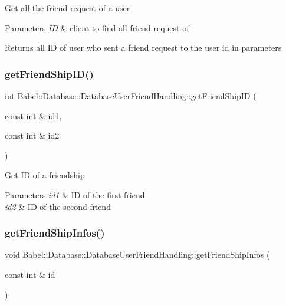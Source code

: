 Get all the friend request of a user 
\begin{DoxyParams}{Parameters}
{\em ID} & client to find all friend request of \\
\hline
\end{DoxyParams}
\begin{DoxyReturn}{Returns}
all ID of user who sent a friend request to the user id in parameters 
\end{DoxyReturn}
\mbox{\label{classBabel_1_1Database_1_1DatabaseUserFriendHandling_a5447e835948344c871e7f47fb66f26c0}} 
\subsubsection{\texorpdfstring{get\+Friend\+Ship\+I\+D()}{getFriendShipID()}}
{\footnotesize\ttfamily int Babel\+::\+Database\+::\+Database\+User\+Friend\+Handling\+::get\+Friend\+Ship\+ID (\begin{DoxyParamCaption}\item[{const int \&}]{id1,  }\item[{const int \&}]{id2 }\end{DoxyParamCaption})}

Get ID of a friendship 
\begin{DoxyParams}{Parameters}
{\em id1} & ID of the first friend \\
\hline
{\em id2} & ID of the second friend \\
\hline
\end{DoxyParams}
\mbox{\label{classBabel_1_1Database_1_1DatabaseUserFriendHandling_a2bed1d6913f15db98bc4ebadf0135310}} 
\subsubsection{\texorpdfstring{get\+Friend\+Ship\+Infos()}{getFriendShipInfos()}}
{\footnotesize\ttfamily void Babel\+::\+Database\+::\+Database\+User\+Friend\+Handling\+::get\+Friend\+Ship\+Infos (\begin{DoxyParamCaption}\item[{const int \&}]{id }\end{DoxyParamCaption})}

